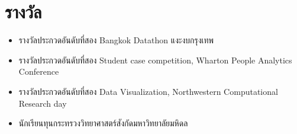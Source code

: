 \section{\sc รางวัล}

\begin{itemize}[leftmargin=0cm, label={}]
\itemsep0em

\item รางวัลประกวดอันดับที่สอง Bangkok Datathon แงะงบกรุงเทพ

\item รางวัลประกวดอันดับที่สอง Student case competition, Wharton People Analytics Conference

\item รางวัลประกวดอันดับที่สอง Data Visualization, Northwestern Computational Research day

\item นักเรียนทุนกระทรวงวิทยาศาสตร์สังกัดมหาวิทยาลัยมหิดล

\end{itemize}
